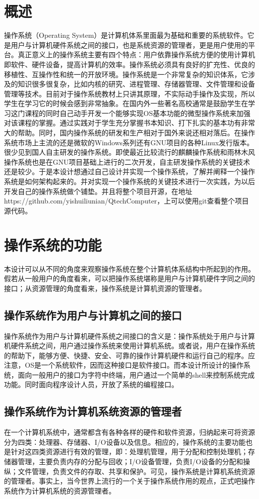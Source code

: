 \documentclass[UTF8,nofonts,cs4size]{ctexrep}
\begin{document}
\section{概述}
操作系统（Operating System）是计算机体系里面最为基础和重要的系统软件。它是用户与计算机硬件系统之间的接口，也是系统资源的管理者，更是用户使用的平台。真正意义上的操作系统主要有四个特点：用户依靠操作系统方便的使用计算机即软件、硬件设备，提高计算机的效率。操作系统必须具有良好的扩充性、优良的移植性、互操作性和统一的开放环境。操作系统是一个非常复杂的知识体系，它涉及的知识很多很复杂，比如内核的研究、进程管理、存储器管理、文件管理和设备管理等技术。目前对于操作系统教材上只讲其原理，不实际动手操作及实现，所以学生在学习它的时候会感到非常抽象。在国内外一些著名高校通常是鼓励学生在学习这门课程的同时自己动手开发一个能够实现OS基本功能的微型操作系统来加强对该课程的掌握。通过实践对于学生充分掌握书本知识、打下扎实的基本功有非常大的帮助。同时，国内操作系统的研发和生产相对于国外来说还相对落后。在操作系统市场上主流的还是微软的Windows系列还有GNU项目的各种Linux发行版本。很少见到国人自主研发的操作系统。即使最近比较流行的麒麟操作系统和雨林木风操作系统也是在GNU项目基础上进行的二次开发，自主研发操作系统的关键技术还是较少。于是本设计想通过自己设计并实现一个操作系统，了解并阐释一个操作系统是如何架构起来的。并对实现一个操作系统的关键技术进行一次实践，为以后开发自己的操作系统做个铺垫。并且将整个项目开源，在地址https://github.com/yishuiliunian/QtechComputer，上可以使用git查看整个项目源代码。
\section{操作系统的功能}
本设计可以从不同的角度来观察操作系统在整个计算机体系结构中所起到的作用。假若从一般用户的角度看来，可以把操作系统堪称是用户与计算机硬件字同之间的接口；从资源管理的角度看来，操作系统是计算机资源的管理者。
\subsection{操作系统作为用户与计算机之间的接口}
操作系统作为用户与计算机硬件系统之间接口的含义是：操作系统处于用户与计算机硬件系统之间，用户通过操作系统来使用计算机系统。或者说，用户在操作系统的帮助下，能够方便、快捷、安全、可靠的操作计算机硬件和运行自己的程序。应注意，OS是一个系统软件，因而这种接口是软件接口。而本设计所设计的操作系统，面向一般用户的接口为字符中终端，用户通过一个简单的shell来控制系统完成功能。同时面向程序设计人员，开放了系统的编程接口。
\subsection{操作系统作为计算机系统资源的管理者}
在一个计算机系统中，通常都含有各种各样的硬件和软件资源，归纳起来可将资源分为四类：处理器、存储器、I/O设备以及信息。相应的，操作系统的主要功能也是针对这四类资源进行有效的管理，即：处理机管理，用于分配和控制处理机；存储器管理，主要负责内存的分配与回收；I/O设备管理，负责I/O设备的分配和操纵；文件管理，负责文件的存取、共享和保护。可见，操作系统是计算机系统资源的管理者。事实上，当今世界上流行的一个关于操作系统作用的观点，正式吧操作系统作为计算机系统的资源管理者。
\end{document}
